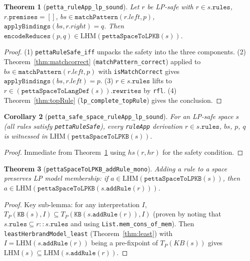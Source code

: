\documentclass[]{article}
\newtheorem{theorem}{Theorem}
\newtheorem{corollary}[theorem]{Corollary}
\newcommand{\code}[1]{\texttt{#1}}
\begin{document}
\begin{theorem}[\code{petta\_ruleApp\_lp\_sound}]
\label{thm:sound}
Let $r$ be LP-safe with $r \in s.\code{rules}$, $r.\code{premises} = []$,
$bs \in \code{matchPattern}(r.left, p)$, $\code{applyBindings}(bs, r.right) = q$.
Then $\code{encodeReduces}(p, q) \in \mathrm{LHM}(\code{pettaSpaceToLPKB}(s))$.
\end{theorem}

\begin{proof}
(1) \code{pettaRuleSafe\_iff} unpacks the safety into the three components.
(2) Theorem~\ref{thm:matchcorrect} (\code{matchPattern\_correct}) applied to
$bs \in \code{matchPattern}(r.left, p)$ with \code{isMatchCorrect} gives
$\code{applyBindings}(bs, r.left) = p$.
(3) $r \in s.\code{rules}$ lifts to $r \in (\code{pettaSpaceToLangDef}(s)).\code{rewrites}$ by \code{rfl}.
(4) Theorem~\ref{thm:topRule} (\code{lp\_complete\_topRule}) gives the conclusion.
\end{proof}

\begin{corollary}[\code{petta\_safe\_space\_ruleApp\_lp\_sound}]
\label{cor:safe}
For an LP-safe space $s$ (all rules satisfy \code{pettaRuleSafe}),
every \code{ruleApp} derivation $r \in s.\code{rules}$, $bs$, $p$, $q$
is witnessed in $\mathrm{LHM}(\code{pettaSpaceToLPKB}(s))$.
\end{corollary}

\begin{proof}
Immediate from Theorem~\ref{thm:sound} using $hs(r, hr)$ for the safety condition.
\end{proof}

\begin{theorem}[\code{pettaSpaceToLPKB\_addRule\_mono}]
Adding a rule to a space preserves LP model membership: if
$a \in \mathrm{LHM}(\code{pettaSpaceToLPKB}(s))$, then
$a \in \mathrm{LHM}(\code{pettaSpaceToLPKB}(s.\code{addRule}(r)))$.
\end{theorem}

\begin{proof}
Key sub-lemma: for any interpretation $I$,
$T_P(\code{KB}(s), I) \subseteq T_P(\code{KB}(s.\code{addRule}(r)), I)$
(proven by noting that $s.\code{rules} \subseteq r :: s.\code{rules}$ and
using \code{List.mem\_cons\_of\_mem}).
Then \code{leastHerbrandModel\_least} (Theorem~\ref{thm:least}) with
$I = \mathrm{LHM}(s.\code{addRule}(r))$ being a pre-fixpoint of $T_P(KB(s))$
gives $\mathrm{LHM}(s) \subseteq \mathrm{LHM}(s.\code{addRule}(r))$.
\end{proof}
\end{document}
